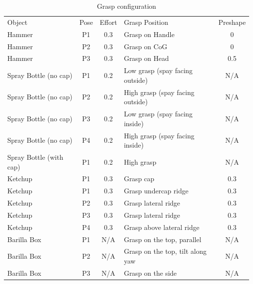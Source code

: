 \begin{table}[hbt]
   \begin{center}
   \begin{tabular}{| p{1.5cm}  | c | c | p{2.5cm} | c |}
   \hline
   Object   & Pose  & Effort &  Grasp Position  & Preshape \\
   \cline{1-5}
   Hammer                   & P1        &   0.3 &   Grasp on Handle &   0   \\\hline
   Hammer                   & P2        &   0.3 &   Grasp on CoG    &   0   \\\hline
   Hammer                   & P3        &   0.3 &   Grasp on Head   &   0.5 \\\hline
   Spray Bottle (no cap)    & P1        &   0.2 &   Low grasp (spay facing outside)     &   N/A \\\hline
   Spray Bottle (no cap)    & P2        &   0.2 &   High grasp  (spay facing outside)   &   N/A \\\hline
   Spray Bottle (no cap)    & P3        &   0.2 &   Low grasp  (spay facing inside)     &   N/A \\\hline
   Spray Bottle (no cap)    & P4        &   0.2 &   High grasp (spay facing inside)             &   N/A \\\hline   
   Spray Bottle (with cap)  & P1        &   0.2 &   High grasp      &   N/A \\\hline
   Ketchup              & P1        &   0.3 &   Grasp cap       &   0.3 \\\hline
   Ketchup              & P1        &   0.3 &   Grasp undercap ridge    &   0.3 \\\hline
   Ketchup              & P2        &   0.3 &   Grasp lateral ridge     &   0.3 \\\hline
   Ketchup              & P3        &   0.3 &   Grasp lateral ridge     &   0.3 \\\hline
   Ketchup              & P4        &   0.3 &   Grasp above lateral ridge       &   0.3 \\\hline
   Barilla Box              & P1        &   N/A &   Grasp on the top, parallel      &   N/A \\\hline
   Barilla Box              & P2        &   N/A &   Grasp on the top, tilt along yaw    &   N/A \\\hline
   Barilla Box              & P3        &   N/A &   Grasp on the side       &   N/A \\\hline   
   
   \end{tabular}
   \end{center}
   \caption{Grasp configuration}
   \label{table:grasp}
\end{table}


